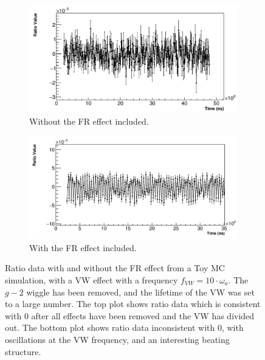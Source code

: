 \documentclass[12pt,letterpaper]{article}
\def\gmtwo{$g-2$\xspace}
\begin{document}
\begin{figure}[]
\centering
    \begin{subfigure}[t]{0.6\textwidth}
        \centering
        \includegraphics[width=\textwidth]{JamesMC_noFR}
        \caption{Without the FR effect included.}
    \end{subfigure}%

    \begin{subfigure}[t]{0.6\textwidth}
        \centering
        \includegraphics[width=\textwidth]{JamesMC_withFR}
        \caption{With the FR effect included.}
    \end{subfigure}
\caption[]{Ratio data with and without the FR effect from a Toy MC simulation, with a VW effect with a frequency $f_{VW} = 10 \cdot \omega_{a}$. The \gmtwo wiggle has been removed, and the lifetime of the VW was set to a large number. The top plot shows ratio data which is consistent with 0 after all effects have been removed and the VW has divided out. The bottom plot shows ratio data inconsistent with 0, with oscillations at the VW frequency, and an interesting beating structure.}
\label{fig:JamesMC_VW_FR}
\end{figure}
\end{document}
